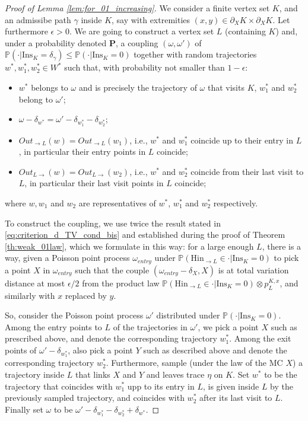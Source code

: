 \documentclass[12pt,a4paper]{article}
\newcommand{\1}[1]{{\mathbf 1}{\{#1\}}}
\newcommand{\8}{{\infty}}
\newcommand{\p}{\mathbb{P}}
\newcommand{\In}{\mathrm{Ins}}
\newcommand{\Hin}{\mathrm{Hin}}
\begin{document}
\begin{proof}[Proof of Lemma \ref{lem:for_01_increasing}]
We consider a finite vertex set $K$, and an admissibe path $\gamma$ inside $K$, say with extremities $(x,y)\in \partial_X K\times \partial_X K$. Let furthermore $\epsilon >0$. We are going to construct a vertex set $L$ (containing $K$) and, under a probability denoted $\mathbf{P}$, a coupling $(\omega , \omega')$ of $\p( \cdot | \In_K=\delta_\gamma) \le \p( \cdot | \In_K=0)$ together with random trajectories $w^*, w_1^*, w_2^*\in W^*$ such that, with probability not smaller than $1-\epsilon$: 
\begin{itemize}
  \item $w^*$ belongs to $\omega$ and is precisely the trajectory of $\omega$ that visits $K$, $w_1^*$ and $w_2^*$ belong to $\omega'$;
  \item $\omega- \delta_{w^*} = \omega'-\delta_{w_1^*}-\delta_{w_2^*}$;
  \item $Out_{\to L}(w)=Out_{\to L}(w_1) $, i.e., $w^*$ and $w_1^*$ coincide up to their entry in $L$, in particular their entry points in $L$ coincide;
  \item $Out_{L \to}(w)=Out_{L \to}(w_2) $, i.e., $w^*$ and $w_2^*$ coincide from their last visit to $L$, in particular their last visit points in $L$ coincide;
\end{itemize}
where $w, w_1$ and $w_2$ are representatives of $w^*$, $w_1^*$ and $w_2^*$ respectively. 

\smallskip

To construct the coupling, we use twice the result stated in \eqref{eq:criterion_d_TV_cond_bis} and established during the proof of Theorem \ref{th:weak_01law}, which we formulate in this way: for a large enough $L$, there is a way, given a Poisson point process $\omega_{entry}$ under $ \p( \Hin_{\to L} \in \cdot | \In_K=0)$ to pick a point $X$ in $\omega_{entry}$ such that the couple $(\omega_{entry}-\delta_X, X)$ is at total variation distance at most $\epsilon/2$ from the product law $ \p( \Hin_{\to L} \in \cdot | \In_K=0) \otimes p_L^{K,x}$, and similarly with $x$ replaced by $y$.

So, consider the Poisson point process $\omega'$ distributed under $\p( \cdot | \In_K=0)$. Among the entry points to $L$ of the trajectories in $\omega'$, we pick a point $X$ such as prescribed above, and denote the corresponding trajectory $w_1^*$. Among the exit points of $\omega' - \delta_{w_1^*}$, also pick a point $Y$ such as described above and denote the corresponding trajectory $w_2^*$. Furthermore, sample (under the law of the MC $X$) a trajectory inside $L$ that links $X$ and $Y$ and leaves trace $\eta$ on $K$. Set $w^*$ to be the trajectory that coincides with $w_1^*$ upp to its entry in $L$, is given inside $L$ by the previously sampled trajectory, and coincides with $w_2^*$ after its last visit to $L$. Finally set $\omega$ to be $\omega'-\delta_{w_1^*} - \delta_{w_2^*} + \delta_{w^*}$. 


\end{proof}
\end{document}
